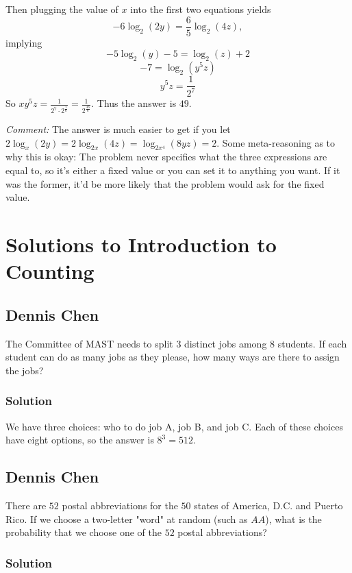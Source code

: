 \documentclass[blue,onecol]{shooting}
\begin{document}
    Then plugging the value of $x$ into the first two equations yields
    \[-6\log_{2}(2y)=\frac{6}{5}\log_{2}(4z),\]
    implying
    \[-5\log_{2}(y)-5=\log_{2}(z)+2\]
    \[-7=\log_{2}(y^5z)\]
    \[y^5z=\frac{1}{2^7}\]
    So $xy^5z=\frac{1}{2^7\cdot 2^{\frac{1}{6}}}=\frac{1}{2^{\frac{43}{6}}}.$ Thus the answer is $49.$
    
\textit{Comment:} The answer is much easier to get if you let $2\log_{x}(2y) = 2\log_{2x}(4z) = \log_{2x^4}(8yz)=2.$ Some meta-reasoning as to why this is okay: The problem never specifies what the three expressions are equal to, so it's either a fixed value or you can set it to anything you want. If it was the former, it'd be more likely that the problem would ask for the fixed value.

\chapter{Solutions to Introduction to Counting}














\section{Dennis Chen}

The Committee of MAST needs to split $3$ distinct jobs among $8$ students. If each student can do as many jobs as they please, how many ways are there to assign the jobs?

\subsection{Solution}
We have three choices: who to do job A, job B, and job C. Each of these choices have eight options, so the answer is $8^3=512.$

\section{Dennis Chen}

There are $52$ postal abbreviations for the $50$ states of America, D.C. and Puerto Rico. If we choose a two-letter "word" at random (such as $AA$), what is the probability that we choose one of the $52$ postal abbreviations?
\subsection{Solution}
\end{document}
